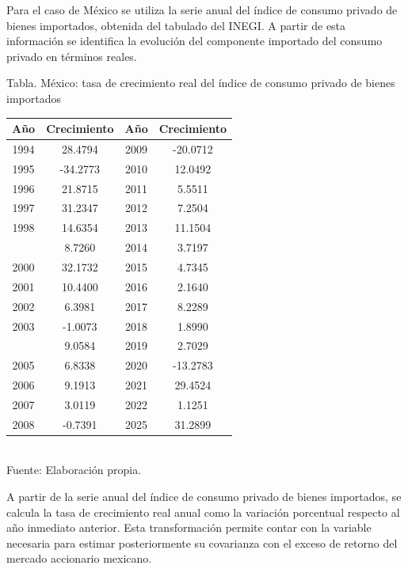 \documentclass{article}\usepackage[]{graphicx}\usepackage[]{xcolor}
\begin{document}
Para el caso de México se utiliza la serie anual del índice de consumo privado de bienes importados, obtenida del tabulado del INEGI. A partir de esta información se identifica la evolución del componente importado del consumo privado en términos reales.



\begin{center}
Tabla. México: tasa de crecimiento real del índice de consumo privado de bienes importados
\end{center}
\begin{center}

\begin{tabular}{cccc}
\toprule
Año & Crecimiento & Año & Crecimiento\\
\midrule
1994 & 28.4794 & 2009 & -20.0712\\
1995 & -34.2773 & 2010 & 12.0492\\
1996 & 21.8715 & 2011 & 5.5511\\
1997 & 31.2347 & 2012 & 7.2504\\
1998 & 14.6354 & 2013 & 11.1504\\
\addlinespace
1999 & 8.7260 & 2014 & 3.7197\\
2000 & 32.1732 & 2015 & 4.7345\\
2001 & 10.4400 & 2016 & 2.1640\\
2002 & 6.3981 & 2017 & 8.2289\\
2003 & -1.0073 & 2018 & 1.8990\\
\addlinespace
2004 & 9.0584 & 2019 & 2.7029\\
2005 & 6.8338 & 2020 & -13.2783\\
2006 & 9.1913 & 2021 & 29.4524\\
2007 & 3.0119 & 2022 & 1.1251\\
2008 & -0.7391 & 2025 & 31.2899\\
\bottomrule
\end{tabular}
\\[0.3em]
{\footnotesize Fuente: Elaboración propia.}
\end{center}


A partir de la serie anual del índice de consumo privado de bienes importados, se calcula la tasa de crecimiento real anual como la variación porcentual respecto al año inmediato anterior. Esta transformación permite contar con la variable necesaria para estimar posteriormente su covarianza con el exceso de retorno del mercado accionario mexicano.
\end{document}
